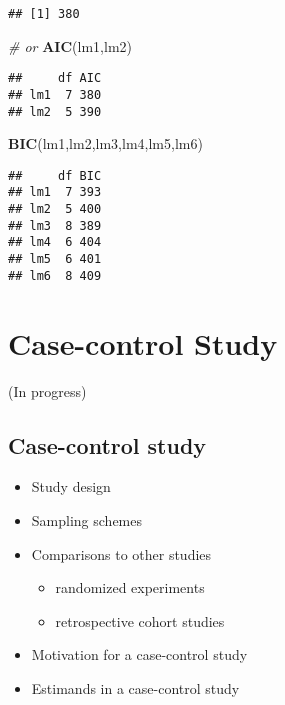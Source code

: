 \documentclass[12pt,]{book}
\newenvironment{Shaded}{\begin{snugshade}}{\end{snugshade}}
\newcommand{\KeywordTok}[1]{\textcolor[rgb]{0.13,0.29,0.53}{\textbf{#1}}}
\newcommand{\CommentTok}[1]{\textcolor[rgb]{0.56,0.35,0.01}{\textit{#1}}}
\newcommand{\NormalTok}[1]{#1}
\providecommand{\tightlist}{%
  \setlength{\itemsep}{0pt}\setlength{\parskip}{0pt}}
\begin{document}
\begin{verbatim}
## [1] 380
\end{verbatim}

\begin{Shaded}
\begin{Highlighting}[]
\CommentTok{# or}
\KeywordTok{AIC}\NormalTok{(lm1,lm2)}
\end{Highlighting}
\end{Shaded}

\begin{verbatim}
##     df AIC
## lm1  7 380
## lm2  5 390
\end{verbatim}

\begin{Shaded}
\begin{Highlighting}[]
\KeywordTok{BIC}\NormalTok{(lm1,lm2,lm3,lm4,lm5,lm6)}
\end{Highlighting}
\end{Shaded}

\begin{verbatim}
##     df BIC
## lm1  7 393
## lm2  5 400
## lm3  8 389
## lm4  6 404
## lm5  6 401
## lm6  8 409
\end{verbatim}

\chapter{Case-control Study}\label{ch:case}

(In progress)

\section{Case-control study}\label{case-control-study}

\begin{itemize}
\tightlist
\item
  Study design
\item
  Sampling schemes
\item
  Comparisons to other studies

  \begin{itemize}
  \tightlist
  \item
    randomized experiments
  \item
    retrospective cohort studies
  \end{itemize}
\item
  Motivation for a case-control study
\item
  Estimands in a case-control study
\end{itemize}
\end{document}
